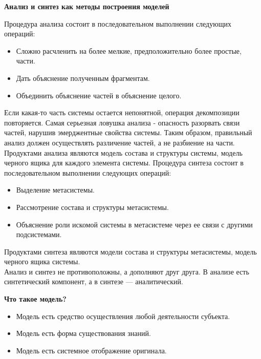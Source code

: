 \documentclass{article}
\renewcommand{\subsection}[1]{
	\vspace{2em}
	\begin{flushright}
		\large
		\textbf{#1}
	\end{flushright}
	}
\begin{document}
\subsection{Анализ и синтез как методы построения моделей}
Процедура анализа состоит в последовательном выполнении следующих операций:
\begin{itemize}
	\item Сложно расчленить на более мелкие, предположительно более простые, части.
	\item Дать объяснение полученным фрагментам.
	\item Объединить объяснение частей в объяснение целого.
\end{itemize}
Если какая-то часть системы остается непонятной, операция декомпозиции повторяется. Самая серьезная ловушка анализа - опасность разорвать связи частей, нарушив эмерджентные свойства системы. Таким образом, правильный анализ должен осуществлять различение частей, а не разбиение на части.\\
Продуктами анализа являются модель состава и структуры системы, модель черного ящика для каждого элемента системы.
Процедура синтеза состоит в последовательном выполнении следующих операций:
\begin{itemize}
	\item Выделение метасистемы.
	\item Рассмотрение состава и структуры метасистемы.
	\item Объяснение роли искомой системы в метасистеме через ее связи с другими подсистемами.
\end{itemize}
Продуктами синтеза являются модели состава и структуры метасистемы, модель черного ящика системы.\\
Анализ и синтез не противоположны, а дополняют друг друга. В анализе есть синтетический компонент, а в синтезе --- аналитический.
\subsection{Что такое модель?}
\begin{itemize}
	\item Модель есть средство осуществления любой деятельности субъекта.
	\item Модель есть форма существования знаний.
	\item Модель есть системное отображение оригинала.
\end{itemize}
\end{document}
